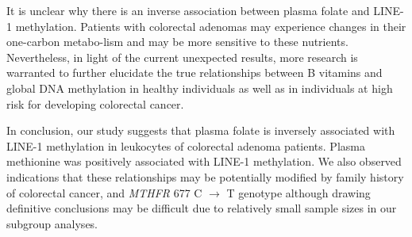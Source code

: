 \noindent It is unclear why there is an inverse association between plasma folate and LINE-1 methylation. Patients with colorectal adenomas may experience changes in their one-carbon metabo-lism and may be more sensitive to these nutrients. Nevertheless, in light of the current unexpected results, more research is warranted to further elucidate the true relationships between B vitamins and global DNA methylation in healthy individuals as well as in individuals at high risk for developing colorectal cancer.

\noindent In conclusion, our study suggests that plasma folate is inversely associated with LINE-1 methylation in leukocytes of colorectal adenoma patients. Plasma methionine was positively associated with LINE-1 methylation. We also observed indications that these relationships may be potentially modified by family history of colorectal cancer, and \emph{MTHFR} 677 C $\rightarrow$ T genotype although drawing definitive conclusions may be difficult due to relatively small sample sizes in our subgroup analyses.

